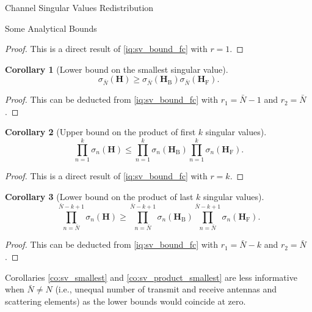 \documentclass[journal]{IEEEtran}
\newtheorem{corollary}{Corollary}[proposition]
\begin{document}
\begin{section}{Channel Singular Values Redistribution}
\begin{subsection}{Some Analytical Bounds}
		\begin{proof}
			This is a direct result of \eqref{iq:sv_bound_fc} with $r = 1$.
		\end{proof}

		\begin{corollary}[Lower bound on the smallest singular value\label{co:sv_smallest}]
			\begin{equation}
				\sigma_{\bar{N}}(\mathbf{H}) \ge \sigma_{\bar{N}}(\mathbf{H}_\mathrm{B}) \sigma_{\bar{N}}(\mathbf{H}_\mathrm{F}).
			\end{equation}
		\end{corollary}

		\begin{proof}
			This can be deducted from \eqref{iq:sv_bound_fc} with $r_1 = \bar{N}{-}1$ and $r_2 = \bar{N}$.
		\end{proof}

		\begin{corollary}[Upper bound on the product of first $k$ singular values]
			\begin{equation}
				\prod_{n=1}^k \sigma_n(\mathbf{H}) \le \prod_{n=1}^k \sigma_n(\mathbf{H}_\mathrm{B}) \prod_{n=1}^k \sigma_n(\mathbf{H}_\mathrm{F}).
			\end{equation}
		\end{corollary}

		\begin{proof}
			This is a direct result of \eqref{iq:sv_bound_fc} with $r = k$.
		\end{proof}

		\begin{corollary}[Lower bound on the product of last $k$ singular values\label{co:sv_product_smallest}]
			\begin{equation}
				\prod_{n=\bar{N}}^{\bar{N}-k+1} \sigma_n(\mathbf{H}) \ge \prod_{n=\bar{N}}^{\bar{N}-k+1} \sigma_n(\mathbf{H}_\mathrm{B}) \prod_{n=\bar{N}}^{\bar{N}-k+1} \sigma_n(\mathbf{H}_\mathrm{F}).
			\end{equation}
		\end{corollary}

		\begin{proof}
			This can be deducted from \eqref{iq:sv_bound_fc} with $r_1 = \bar{N}-k$ and $r_2 = \bar{N}$.
		\end{proof}

		Corollaries \ref{co:sv_smallest} and \ref{co:sv_product_smallest} are less informative when $\bar{N} \ne N$ (i.e., unequal number of transmit and receive antennas and scattering elements) as the lower bounds would coincide at zero.


\end{subsection}
\end{section}
\end{document}
